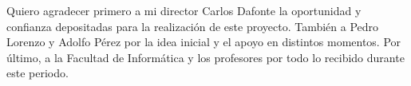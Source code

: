 \documentclass[11pt,a4paper,titlepage,twoside,openright,openbib]{report}
\begin{document}

 
 \paxinaenbranco
 \paxinaenbranco
 \paxinaenbranco
 \begin{agradecementos}
Quiero agradecer primero a mi director Carlos Dafonte la oportunidad y confianza depositadas para la realización de este proyecto. También a Pedro Lorenzo y Adolfo Pérez por la idea inicial y el apoyo en distintos momentos. Por último, a la Facultad de Informática y los profesores por todo lo recibido durante este periodo.
 \end{agradecementos}
 \paxinaenbranco
 
 \paxinaenbranco

 \setcounter{page}{1}

 \tableofcontents
 \listoffigures
 \listoftables
 \lstlistoflistings
 \cleardoublepage

 \setcounter{page}{1}


 
 
 
 
 
 
 
 
  


 \appendix
 \appendixpage
 
 
  
 \printglossary[type=\acronymtype,title=\nomeglosarioacronimos]
 \printglossary[title=\nomeglosariotermos]

 
 
 \cleardoublepage
\end{document}
